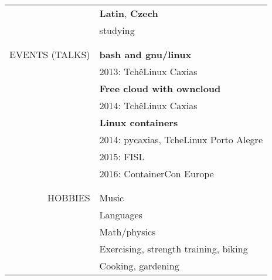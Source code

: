 \begin{tabular}{rp{12cm}}
    & \textbf{Latin}, \textbf{Czech} \\
    & studying
    \\\\ \hline \\
    \uppercase{Events (talks)}
    & \textbf{bash and gnu/linux} \\
    & 2013: TchêLinux Caxias \\
    & \textbf{Free cloud with owncloud} \\
    & 2014: TchêLinux Caxias \\
    & \textbf{Linux containers} \\
    & 2014: pycaxias, TcheLinux Porto Alegre \\
    & 2015: FISL \\
    & 2016: ContainerCon Europe
    \\\\ \hline \\
    \uppercase{Hobbies}
    & Music \\
    & Languages \\
    & Math/physics \\
    & Exercising, strength training, biking \\
    & Cooking, gardening
\end{tabular}
